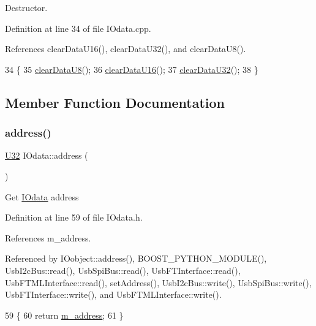Destructor. 



Definition at line 34 of file I\+Odata.\+cpp.



References clear\+Data\+U16(), clear\+Data\+U32(), and clear\+Data\+U8().


\begin{DoxyCode}
34                 \{
35   \hyperlink{classIOdata_a9bc3ea0458ea6d13bd751ac4c80a4be6}{clearDataU8}();
36   \hyperlink{classIOdata_a13016f489aba6e80cd7be53224c3e8ab}{clearDataU16}();
37   \hyperlink{classIOdata_a848de1b6e7b7207dbb53c102a4d911a9}{clearDataU32}();
38 \}
\end{DoxyCode}


\subsection{Member Function Documentation}
\mbox{\label{classIOdata_afe410c86881b8c2082a08e5ce9843306}} 
\subsubsection{\texorpdfstring{address()}{address()}}
{\footnotesize\ttfamily \hyperlink{classIOdata_a96fb57f5fcd87b708743abd3c86a5198}{U32} I\+Odata\+::address (\begin{DoxyParamCaption}{ }\end{DoxyParamCaption})\hspace{0.3cm}{\ttfamily [inline]}}

Get \hyperlink{classIOdata}{I\+Odata} address 

Definition at line 59 of file I\+Odata.\+h.



References m\+\_\+address.



Referenced by I\+Oobject\+::address(), B\+O\+O\+S\+T\+\_\+\+P\+Y\+T\+H\+O\+N\+\_\+\+M\+O\+D\+U\+L\+E(), Usb\+I2c\+Bus\+::read(), Usb\+Spi\+Bus\+::read(), Usb\+F\+T\+Interface\+::read(), Usb\+F\+T\+M\+L\+Interface\+::read(), set\+Address(), Usb\+I2c\+Bus\+::write(), Usb\+Spi\+Bus\+::write(), Usb\+F\+T\+Interface\+::write(), and Usb\+F\+T\+M\+L\+Interface\+::write().


\begin{DoxyCode}
59                \{
60     \textcolor{keywordflow}{return} \hyperlink{classIOdata_a965810e1888b904c575277f50cea734a}{m\_address};
61   \}
\end{DoxyCode}
\mbox{\label{classIOdata_aeda27840c9a9b7b3b86efc71c56cd868}} 
